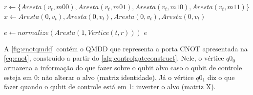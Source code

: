 \begin{algorithm}[H]
  \caption{Construção de portas controladas}
  \label{alg:controlgateconstruct}

  $r \gets \{Aresta(v_t, m00), Aresta(v_t, m01), Aresta(v_t, m10), Aresta(v_t, m11)\}$ \;
  $x \gets {Aresta(0, v_t), Aresta(0, v_t), Aresta(0, v_t), Aresta(0, v_t)} $

  $e \gets normalize(Aresta(1, Vertice(t, r)))$ \;
  \Return $e$
\end{algorithm}

A \cref{fig:cnotqmdd} contém o QMDD que representa a porta CNOT apresentada na \cref{eq:cnot}, construído a partir do \cref{alg:controlgateconstruct}. Nele, o vértice $q0_0$ armazena a informação do que fazer sobre o qubit alvo caso o qubit de controle esteja em 0: não alterar o alvo (matriz identidade). Já o vértice $q0_1$ diz o que fazer quando o qubit de controle está em 1: inverter o alvo (matriz X).

